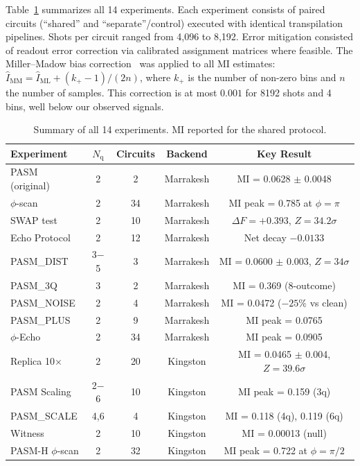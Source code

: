 ﻿\documentclass[12pt,a4paper]{article}
\begin{document}
Table~\ref{tab:experiments} summarizes all 14 experiments. Each experiment consists of paired circuits (``shared'' and ``separate''/control) executed with identical transpilation pipelines. Shots per circuit ranged from 4,096 to 8,192. Error mitigation consisted of readout error correction via calibrated assignment matrices where feasible. The Miller--Madow bias correction~\cite{miller1955} was applied to all MI estimates: $\hat{I}_{\text{MM}} = \hat{I}_{\text{ML}} + (k_+ - 1)/(2n)$, where $k_+$ is the number of non-zero bins and $n$ the number of samples. This correction is at most $0.001$ for 8192 shots and 4 bins, well below our observed signals.

\begin{table}[ht]
\centering
\caption{Summary of all 14 experiments. MI reported for the shared protocol.}
\label{tab:experiments}
\small
\begin{tabular}{lcccc}
\toprule
Experiment & $N_{\text{q}}$ & Circuits & Backend & Key Result \\
\midrule
PASM (original) & 2 & 2 & Marrakesh & MI = 0.0628 $\pm$ 0.0048 \\
$\phi$-scan & 2 & 34 & Marrakesh & MI peak = 0.785 at $\phi = \pi$ \\
SWAP test & 2 & 10 & Marrakesh & $\Delta F = +0.393$, $Z = 34.2\sigma$ \\
Echo Protocol & 2 & 12 & Marrakesh & Net decay $-0.0133$ \\
PASM\_DIST & 3$-$5 & 3 & Marrakesh & MI = 0.0600 $\pm$ 0.003, $Z = 34\sigma$ \\
PASM\_3Q & 3 & 2 & Marrakesh & MI = 0.369 (8-outcome) \\
PASM\_NOISE & 2 & 4 & Marrakesh & MI = 0.0472 ($-25\%$ vs clean) \\
PASM\_PLUS & 2 & 9 & Marrakesh & MI peak = 0.0765 \\
$\phi$-Echo & 2 & 34 & Marrakesh & MI peak = 0.0905 \\
Replica 10$\times$ & 2 & 20 & Kingston & MI = 0.0465 $\pm$ 0.004, $Z = 39.6\sigma$ \\
PASM Scaling & 2$-$6 & 10 & Kingston & MI peak = 0.159 (3q) \\
PASM\_SCALE & 4,6 & 4 & Kingston & MI = 0.118 (4q), 0.119 (6q) \\
Witness & 2 & 10 & Kingston & MI = 0.00013 (null) \\
PASM-H $\phi$-scan & 2 & 32 & Kingston & MI peak = 0.722 at $\phi = \pi/2$ \\
\bottomrule
\end{tabular}
\end{table}
\end{document}
